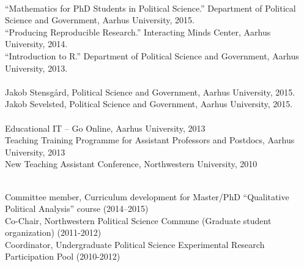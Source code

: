\documentclass[12pt]{article}
\renewcommand{\section}[1]{\pagebreak[3]%
    \llap{\scshape\smash{\parbox[t]{\marginparwidth}{\raggedright {\color{lg}#1}}}}%
    \vspace{-\baselineskip}\par}
\newcommand{\topic}[1]{\pagebreak[3]\indent {\color{lg}{\footnotesize #1 }}\\}
\newcommand{\entry}[1]{\indent {\color{lg}\guillemotright}\hspace{2pt}#1\vspace{.25em}\\}
\begin{document}
\topic{Short courses}
\entry{``Mathematics for PhD Students in Political Science.'' Department of Political Science and Government, Aarhus University, 2015.}
\entry{``Producing Reproducible Research.'' Interacting Minds Center, Aarhus University, 2014.}
\entry{``Introduction to R.'' Department of Political Science and Government, Aarhus University, 2013.}

\topic{Master Advising}
\entry{Jakob Stensg{\aa}rd, Political Science and Government, Aarhus University, 2015.}
\entry{Jakob Sevelsted, Political Science and Government, Aarhus University, 2015.}

\topic{Pedagogical Training}
\entry{Educational IT -- Go Online, Aarhus University, 2013}
\entry{Teaching Training Programme for Assistant Professors and Postdocs, Aarhus University, 2013}
\entry{New Teaching Assistant Conference, Northwestern University, 2010}

\section{Service}
\topic{Departmental}
\entry{Committee member, Curriculum development for Master/PhD ``Qualitative Political Analysis'' course (2014--2015)}
\entry{Co-Chair, Northwestern Political Science Commune (Graduate student organization) (2011-2012)}
\entry{Coordinator, Undergraduate Political Science Experimental Research Participation Pool (2010-2012)}
\end{document}
